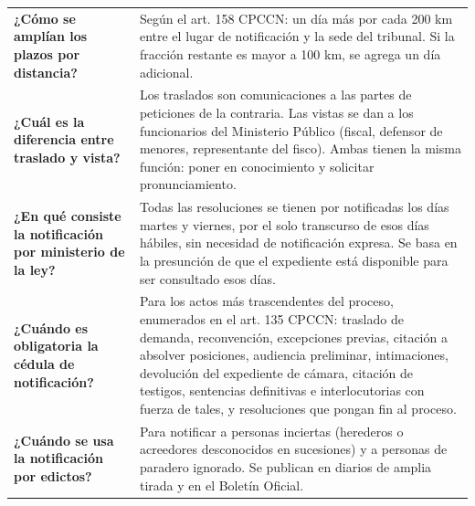 \documentclass[12pt,oneside]{book}
\begin{document}
\begin{table}[H]
\begin{tabularx}{\textwidth}{
    >{\raggedright\arraybackslash}p{}
    >{\raggedright\arraybackslash}X
}
\textbf{¿Cómo se amplían los plazos por distancia?} &
Según el art. 158 CPCCN: un día más por cada 200 km entre el lugar de notificación y la sede del tribunal. Si la fracción restante es mayor a 100 km, se agrega un día adicional. \\[0.5em]

\textbf{¿Cuál es la diferencia entre traslado y vista?} &
Los traslados son comunicaciones a las partes de peticiones de la contraria. Las vistas se dan a los funcionarios del Ministerio Público (fiscal, defensor de menores, representante del fisco). Ambas tienen la misma función: poner en conocimiento y solicitar pronunciamiento. \\[0.5em]

\textbf{¿En qué consiste la notificación por ministerio de la ley?} &
Todas las resoluciones se tienen por notificadas los días martes y viernes, por el solo transcurso de esos días hábiles, sin necesidad de notificación expresa. Se basa en la presunción de que el expediente está disponible para ser consultado esos días. \\[0.5em]

\textbf{¿Cuándo es obligatoria la cédula de notificación?} &
Para los actos más trascendentes del proceso, enumerados en el art. 135 CPCCN: traslado de demanda, reconvención, excepciones previas, citación a absolver posiciones, audiencia preliminar, intimaciones, devolución del expediente de cámara, citación de testigos, sentencias definitivas e interlocutorias con fuerza de tales, y resoluciones que pongan fin al proceso. \\[0.5em]

\textbf{¿Cuándo se usa la notificación por edictos?} &
Para notificar a personas inciertas (herederos o acreedores desconocidos en sucesiones) y a personas de paradero ignorado. Se publican en diarios de amplia tirada y en el Boletín Oficial. \\

\midrule


\end{tabularx}
\end{table}
\end{document}
